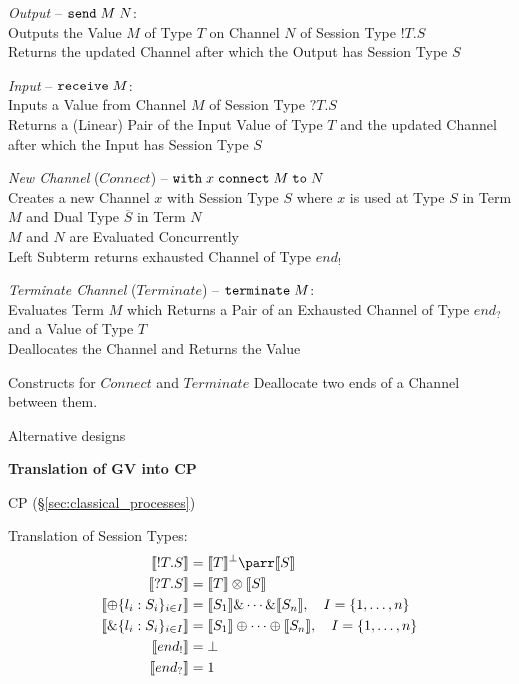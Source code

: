 \emph{Output} -- $\mathtt{send}\; M\;N$: \\
Outputs the Value $M$ of Type $T$ on Channel $N$ of Session Type
$!T.S$ \\
Returns the updated Channel after which the Output has Session Type
$S$

\emph{Input} -- $\mathtt{receive}\; M$: \\
Inputs a Value from Channel $M$ of Session Type $?T.S$ \\
Returns a (Linear) Pair of the Input Value of Type $T$ and the updated
Channel after which the Input has Session Type $S$

\emph{New Channel} ($Connect$) -- $\mathtt{with}\; x \;\mathtt{connect}\;
M \;\mathtt{to}\; N$ \\
Creates a new Channel $x$ with Session Type $S$ where $x$ is used at
Type $S$ in Term $M$ and Dual Type $\overline{S}$ in Term $N$ \\
$M$ and $N$ are Evaluated Concurrently \\
Left Subterm returns exhausted Channel of Type $end_!$ %

\emph{Terminate Channel} ($Terminate$) -- $\mathtt{terminate}\; M$: \\
Evaluates Term $M$ which Returns a Pair of an Exhausted Channel of
Type $end_?$ and a Value of Type $T$ \\
Deallocates the Channel and Returns the Value

Constructs for $Connect$ and $Terminate$ Deallocate two ends of a
Channel between them.

Alternative designs %


\asterism


\textbf{Translation of GV into CP}

CP (\S\ref{sec:classical_processes})

Translation of Session Types:
\begin{align*}
  \llbracket !T.S \rrbracket &=
    \llbracket T \rrbracket^\bot \parr \llbracket S \rrbracket \\
  \llbracket ?T.S \rrbracket &=
    \llbracket T \rrbracket \otimes \llbracket S \rrbracket \\
  \llbracket \oplus \{l_i : S_i\}_{i \in I} \rrbracket &=
    \llbracket S_1 \rrbracket \& \cdots \& \llbracket S_n \rrbracket,
    \quad I = \{1,\ldots,n\} \\
  \llbracket \& \{l_i : S_i\}_{i \in I} \rrbracket &=
    \llbracket S_1 \rrbracket \oplus \cdots \oplus
    \llbracket S_n \rrbracket, \quad I = \{1,\ldots,n\} \\
  \llbracket end_! \rrbracket &= \bot \\
  \llbracket end_? \rrbracket &= 1
\end{align*}

